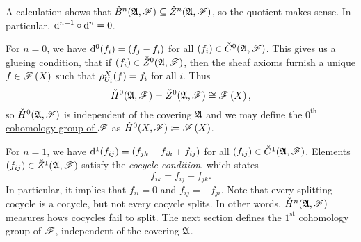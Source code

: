 \documentclass[../Moduli_Spaces_of_Riemann_Surfaces.tex]{subfiles}
\begin{document}
    \vspace{-0.05in}
    \begin{remark}
        A calculation shows that $\check{B}^n\!\left(\mathfrak{A},\mathscr{F}\right)\subseteq\check{Z}^n\!\left(\mathfrak{A},\mathscr{F}\right)$, so the quotient makes sense. In particular, $\mathrm{d}^{n+1}\circ\mathrm{d}^n=0$.\exqed
    \end{remark}
    \begin{remark}
        For $n=0$, we have $\mathrm{d}^0\!\left(f_i\right)=\left(f_j-f_i\right)$ for all $\left(f_i\right)\in\check{C}^0\!\left(\mathfrak{A},\mathscr{F}\right)$. This gives us a glueing condition, that if $\left(f_i\right)\in\check{Z}^0\!\left(\mathfrak{A},\mathscr{F}\right)$, then the sheaf axioms furnish a unique $f\in\mathscr{F}\left(X\right)$ such that $\rho^X_{U_i}\!\left(f\right)=f_i$ for all $i$. Thus
        \begin{equation*}
            \check{H}^0\!\left(\mathfrak{A},\mathscr{F}\right)=\check{Z}^0\!\left(\mathfrak{A},\mathscr{F}\right)\cong\mathscr{F}\left(X\right),
        \end{equation*}
        so $\check{H}^0\!\left(\mathfrak{A},\mathscr{F}\right)$ is independent of the covering $\mathfrak{A}$ and we may define the \ul{$0^\textrm{th}$ cohomology group of $\mathscr{F}$} as $\check{H}^0\!\left(X,\mathscr{F}\right)\coloneqq\mathscr{F}\left(X\right)$.\exqed
    \end{remark}
    \begin{remark}
        For $n=1$, we have $\mathrm{d}^1\!\left(f_{ij}\right)=\left(f_{jk}-f_{ik}+f_{ij}\right)$ for all $\left(f_{ij}\right)\in\check{C}^1\!\left(\mathfrak{A},\mathscr{F}\right)$. Elements $\left(f_{ij}\right)\in\check{Z}^1\!\left(\mathfrak{A},\mathscr{F}\right)$ satisfy the \textit{cocycle condition}, which states
        \begin{equation*}
            f_{ik}=f_{ij}+f_{jk}.
        \end{equation*}
        In particular, it implies that $f_{ii}=0$ and $f_{ij}=-f_{ji}$. Note that every splitting cocycle is a cocycle, but not every cocycle splits. In other words, $\check{H}^n\!\left(\mathfrak{A},\mathscr{F}\right)$ measures hows cocycles fail to split. The next section defines the $1^\textrm{st}$ cohomology group of $\mathscr{F}$, independent of the covering $\mathfrak{A}$.\exqed
    \end{remark}
\end{document}
